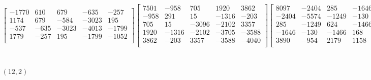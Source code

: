 \documentclass[12pt]{amsart}
\theoremstyle{plain}
\theoremstyle{definition}
\begin{document}
\begin{landscape}
\begin{align*}
\begin{bmatrix}
 -1770  &   610  &   679  &   -635  &   -257  \\ 
 1174  &   679  &   -584  &   -3023  &   195  \\ 
 -537  &   -635  &   -3023  &   -4013  &   -1799  \\ 
 1779  &   -257  &   195  &   -1799  &   -1052  \\ 
\end{bmatrix}
\begin{bmatrix}
7501  &   -958  &   705  &   1920  &   3862  \\ 
 -958  &   291  &   15  &   -1316  &   -203  \\ 
 705  &   15  &   -3096  &   -2102  &   3357  \\ 
 1920  &   -1316  &   -2102  &   -3705  &   -3588  \\ 
 3862  &   -203  &   3357  &   -3588  &   -4040  \\ 
\end{bmatrix}
\begin{bmatrix}
8097  &   -2404  &   285  &   -1646  &   3890  \\ 
 -2404  &   -5574  &   -1249  &   -130  &   -954  \\ 
 285  &   -1249  &   624  &   -1466  &   2179  \\ 
 -1646  &   -130  &   -1466  &   168  &   1158  \\ 
 3890  &   -954  &   2179  &   1158  &   -3413  \\ 
\end{bmatrix}
\begin{bmatrix}
-9830  &   1791  &   -1207  &   675  &   -1929  \\ 
 1791  &   -725  &   -404  &   439  &   173  \\ 
 -1207  &   -404  &   -1505  &   1012  &   -1014  \\ 
 675  &   439  &   1012  &   -845  &   449  \\ 
 -1929  &   173  &   -1014  &   449  &   -1110  \\ 
\end{bmatrix}
\\
(12,2) &:
\begin{bmatrix}
-3258  &   -792  &   5442  &   344  &   1437  \\ 
 -792  &   -1888  &   509  &   -1967  &   -4488  \\ 
 5442  &   509  &   -4912  &   1536  &   4675  \\ 
 344  &   -1967  &   1536  &   2854  &   3178  \\ 
 1437  &   -4488  &   4675  &   3178  &   1652  \\ 

\end{bmatrix}
\end{align*}
\end{landscape}
\end{document}
